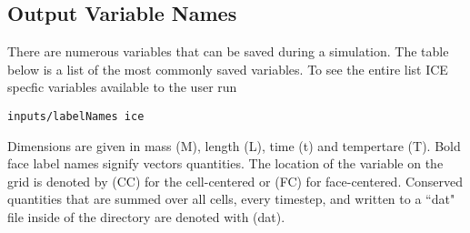 \subsection{Output Variable Names}
There are numerous variables that can be saved during a simulation.  The table below is
a list of the most commonly saved variables.  To see the entire list ICE
specfic variables available to the user run
%
\begin{Verbatim}[fontsize=\footnotesize]
  inputs/labelNames ice
\end{Verbatim}
% 
Dimensions are given in mass (M), length (L), time (t) and tempertare
(T).  Bold face label names signify vectors quantities.  The location of
the variable on the grid is denoted by (CC) for the cell-centered or (FC)
for face-centered.  Conserved quantities that are summed over all cells, every
timestep, and written to a ``dat" file inside of the  directory are denoted with (dat).
%
\newpage
